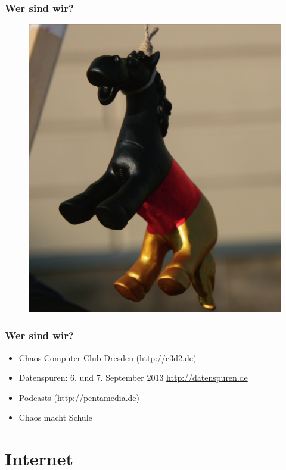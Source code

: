 \documentclass[12pt]{beamer}
\begin{document}
\begin{frame}
  \frametitle{Wer sind wir?}
  \begin{figure}
    \includegraphics[height=0.7\textheight]{img/trojaner.jpg}
  \end{figure}
\end{frame}

\begin{frame}
    \frametitle{Wer sind wir?}
    \begin{itemize}
      \item<1-> Chaos Computer Club Dresden (\url{http://c3d2.de})
          \note{}
      \item<2-> Datenspuren: 6. und 7. September 2013 \url{http://datenspuren.de}
      \item<3-> Podcasts (\url{http://pentamedia.de})
      \item<4-> Chaos macht Schule
    \end{itemize}
\end{frame}

\section{Internet}
\end{document}
